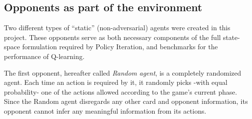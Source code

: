 \begin{table}[htpb]
\centering
{}
\caption{(a) Legal actions of players according to their position and difference between opponent's and player's chips. (b) The actions a Threshold agent selects at any possible state. If both actions shown are legal, the one with higher priority (lower number) will be selected.}
\label{table:actions}
\end{table}

\subsection{Opponents as part of the environment}
\label{sec:opponents}

Two different types of ``static'' (non-adversarial) agents were created in this project. These opponents serve as both necessary components of the full state-space formulation required by Policy Iteration, and benchmarks for the performance of Q-learning.

The first opponent, hereafter called \textit{Random agent}, is a completely randomized agent. Each time an action is required by it, it randomly picks -with equal probability- one of the actions allowed according to the game's current phase. Since the Random agent disregards any other card and opponent information, its opponent cannot infer any meaningful information from its actions.

